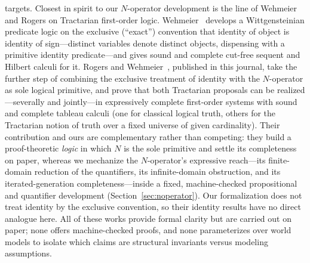 \documentclass[jsl,bibother]{asl}
\theoremstyle{definition}
\theoremstyle{remark}
\begin{document}
targets.
Closest in spirit to our $N$-operator development is the line
of Wehmeier and Rogers on Tractarian first-order logic.
Wehmeier~\cite{wehmeier2004} develops a Wittgensteinian
predicate logic on the exclusive (``exact'') convention that
identity of object is identity of sign---distinct variables
denote distinct objects, dispensing with a primitive identity
predicate---and gives sound and complete cut-free sequent and
Hilbert calculi for it.  Rogers and Wehmeier~\cite{rogers2012},
published in this journal, take the further step of combining
the exclusive treatment of identity with the $N$-operator as
sole logical primitive, and prove that both Tractarian
proposals can be realized---severally and jointly---in
expressively complete first-order systems with sound and
complete tableau calculi (one for classical logical truth,
others for the Tractarian notion of truth over a fixed
universe of given cardinality).  Their contribution and ours
are complementary rather than competing: they build a
proof-theoretic \emph{logic} in which $N$ is the sole
primitive and settle its completeness on paper, whereas we
mechanize the $N$-operator's expressive reach---its
finite-domain reduction of the quantifiers, its infinite-domain
obstruction, and its iterated-generation completeness---inside
a fixed, machine-checked propositional and quantifier
development (Section~\ref{sec:noperator}).  Our formalization
does not treat identity by the exclusive convention, so their
identity results have no direct analogue here.
All of these works provide formal clarity but are carried out
on paper; none offers machine-checked proofs, and none
parameterizes over world models to isolate which claims are
structural invariants versus modeling assumptions.
\end{document}
